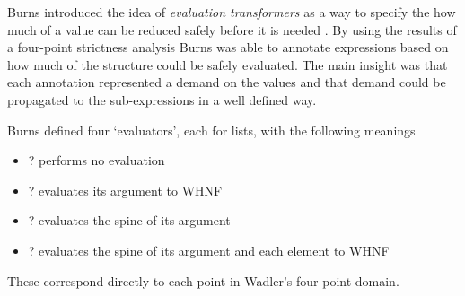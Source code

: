 Burns introduced the idea of \emph{evaluation transformers} as a way to specify
the how much of a value can be reduced safely before it is needed
\citep{burn1987evaluation}. By using the results of a four-point strictness
analysis Burns was able to annotate expressions based on how much of the
structure could be safely evaluated. The main insight was that each annotation
represented a demand on the values and that demand could be propagated to the
sub-expressions in a well defined way.

Burns defined four `evaluators', each for lists, with the following meanings


\begin{itemize}
    \item ? performs no evaluation
    \item ? evaluates its argument to WHNF
    \item ? evaluates the spine of its argument
    \item ? evaluates the spine of its argument and each element to WHNF
\end{itemize}

These correspond directly to each point in Wadler's four-point domain.
